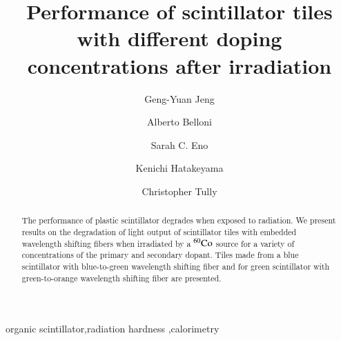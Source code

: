 \documentclass[review]{elsarticle}
\begin{document}
\begin{frontmatter}

\title{Performance of scintillator tiles with different doping concentrations after irradiation }


\author[umd]{Geng-Yuan Jeng}
\author[umd]{Alberto Belloni}
\author[umd]{Sarah C. Eno}
\author[baylor]{Kenichi Hatakeyama}
\author[princeton]{Christopher Tully}



\address[umd]{Dept. Physics, U. Maryland, College Park MD 30742 USA}
\address[eljen]{Eljen Technology, 1300 W. Broadway, Sweetwater, Tx 79556 USA}
\address[fnal]{Fermi National Accelerator Laboratory, Batavia, IL, USA}
\address[baylor]{Baylor University, Waco, Texas, USA}
\address[princeton]{Princeton University, Princeton, NJ, USA}

\begin{abstract}
The performance of plastic scintillator degrades when exposed to radiation. We present results on the degradation of light output of scintillator
tiles with embedded wavelength shifting  fibers  when irradiated by a $\rm{^{60}Co}$ source for a variety of concentrations of the primary and secondary dopant.  Tiles made from a blue scintillator with blue-to-green wavelength shifting fiber and for green scintillator with green-to-orange wavelength shifting fiber are presented.
\end{abstract}

\begin{keyword}
organic scintillator\sep radiation hardness \sep calorimetry
\end{keyword}

\end{frontmatter}

\linenumbers
\end{document}
